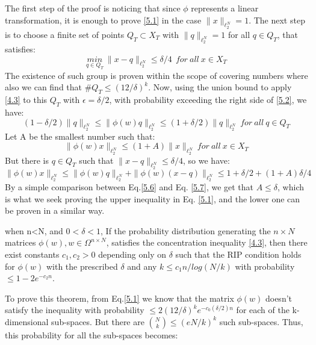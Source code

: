 The first step of the proof is noticing that since $\phi$ represents a linear transformation, it is enough to prove \ref{5.1} in the case $\|x\|_{\ell_2^N}=1$. The next step is to choose a finite set of points $Q_T\subset X_T$ with $\|q\|_{\ell_2^N}=1$ for all $q\in Q_T$, that satisfies:
\begin{equation}
    \underset{q\in Q_T}{min}~ \|x-q\|_{\ell_2^N}\leq\delta/4 ~~for ~all ~x\in X_T
\end{equation}
The existence of such group is proven within the scope of covering numbers where also we can find that $\#Q_T\leq (12/\delta)^k$. Now, using the union bound to apply \ref{4.3} to this $Q_T$ with $\epsilon=\delta/2$, with
probability exceeding the right side of \ref{5.2}, we have:
\begin{equation}
(1-\delta/2) \| q\|_{\ell_2^N}  
\leq
\| \phi(w)q\|_{\ell_2^N} 
\leq
(1+\delta/2) \| q\|_{\ell_2^N} ~for ~all ~q\in Q_T
\end{equation}
Let A be the smallest number such that:
\begin{equation}
     \| \phi(w)x\|_{\ell_2^N} \leq (1+A) \| x\|_{\ell_2^N} ~for ~all ~x\in X_T
\label{5.6}
\end{equation}
But there is $q\in Q_T$ such that $\| x-q\|_{\ell_2^N}\leq \delta/4 $, so we have:
\begin{equation}
    \| \phi(w)x\|_{\ell_2^N} \leq
    \| \phi(w)q\|_{\ell_2^N} +
    \| \phi(w)(x-q)\|_{\ell_2^N} \leq
    1+\delta/2 +(1+A)\delta/4
    \label{5.7}
\end{equation}
By a simple comparison between Eq.\ref{5.6} and Eq. \ref{5.7}, we get that $A\leq \delta$, which is what we seek proving the upper inequality in Eq. \ref{5.1}, and the lower one can be proven in a similar way.
\begin{theorem}
when n<N, and $0< \delta< 1$,  If the probability distribution generating the $n\times N$ matrices $\phi(w), w\in \Omega^{n\times N}$, satisfies the concentration inequality \ref{4.3}, then there exist constants $c_1, c_2> 0$ depending only on $\delta$ such that
the RIP condition holds for $\phi(w)$ with the prescribed $\delta$ and any $k \leq c_1n/log(N/k)$ with probability $\leq 1-2e^{-c_2n}$.
\end{theorem}
To prove this theorem, from Eq.\ref{5.1} we know that the matrix $\phi(w)$ doesn't satisfy the inequality with probability $\leq 2(12/\delta)^ke^{-c_0(\delta/2)n}$ for each of the k-dimensional sub-spaces. But there are $\binom{N}{k}\leq (eN/k)^k$ such sub-spaces. Thus, this probability for all the sub-spaces becomes: 

